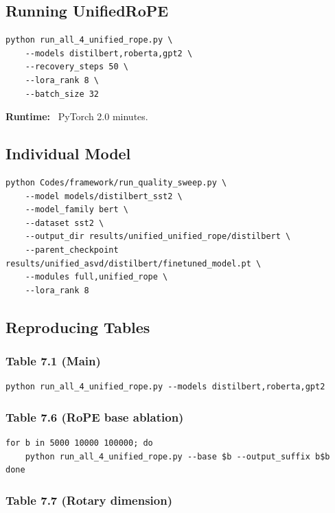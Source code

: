 {\subsection{Running UnifiedRoPE}

\begin{lstlisting}
python run_all_4_unified_rope.py \
    --models distilbert,roberta,gpt2 \
    --recovery_steps 50 \
    --lora_rank 8 \
    --batch_size 32
\end{lstlisting}

\textbf{Runtime:} ~PyTorch 2.0 minutes.

\subsection{Individual Model}

\begin{lstlisting}
python Codes/framework/run_quality_sweep.py \
    --model models/distilbert_sst2 \
    --model_family bert \
    --dataset sst2 \
    --output_dir results/unified_unified_rope/distilbert \
    --parent_checkpoint results/unified_asvd/distilbert/finetuned_model.pt \
    --modules full,unified_rope \
    --lora_rank 8
\end{lstlisting}

\subsection{Reproducing Tables}

\subsubsection{Table 7.1 (Main)}

\begin{lstlisting}
python run_all_4_unified_rope.py --models distilbert,roberta,gpt2
\end{lstlisting}

\subsubsection{Table 7.6 (RoPE base ablation)}

\begin{lstlisting}
for b in 5000 10000 100000; do
    python run_all_4_unified_rope.py --base $b --output_suffix b$b
done
\end{lstlisting}

\subsubsection{Table 7.7 (Rotary dimension)}

}
